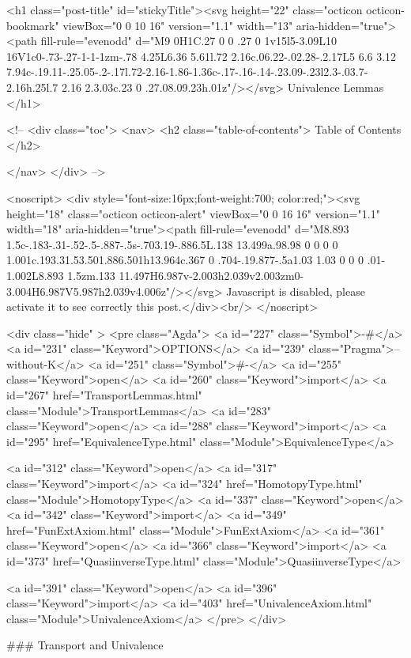   <h1 class="post-title" id="stickyTitle"><svg height="22" class="octicon octicon-bookmark" viewBox="0 0 10 16" version="1.1" width="13" aria-hidden="true"><path fill-rule="evenodd" d="M9 0H1C.27 0 0 .27 0 1v15l5-3.09L10 16V1c0-.73-.27-1-1-1zm-.78 4.25L6.36 5.61l.72 2.16c.06.22-.02.28-.2.17L5 6.6 3.12 7.94c-.19.11-.25.05-.2-.17l.72-2.16-1.86-1.36c-.17-.16-.14-.23.09-.23l2.3-.03.7-2.16h.25l.7 2.16 2.3.03c.23 0 .27.08.09.23h.01z"/></svg> Univalence Lemmas
  </h1>

  <!-- 
  <div class="toc">
    <nav>
    <h2 class="table-of-contents"> Table of Contents </h2>
      

    </nav>
  </div>
   -->

  <noscript>
  <div style="font-size:16px;font-weight:700; color:red;"><svg height="18" class="octicon octicon-alert" viewBox="0 0 16 16" version="1.1" width="18" aria-hidden="true"><path fill-rule="evenodd" d="M8.893 1.5c-.183-.31-.52-.5-.887-.5s-.703.19-.886.5L.138 13.499a.98.98 0 0 0 0 1.001c.193.31.53.501.886.501h13.964c.367 0 .704-.19.877-.5a1.03 1.03 0 0 0 .01-1.002L8.893 1.5zm.133 11.497H6.987v-2.003h2.039v2.003zm0-3.004H6.987V5.987h2.039v4.006z"/></svg> Javascript is disabled, please activate it to see correctly this post.</div><br/>
  </noscript>

  <div class="hide" >
<pre class="Agda">
<a id="227" class="Symbol">{-#</a> <a id="231" class="Keyword">OPTIONS</a> <a id="239" class="Pragma">--without-K</a> <a id="251" class="Symbol">#-}</a>
<a id="255" class="Keyword">open</a> <a id="260" class="Keyword">import</a> <a id="267" href="TransportLemmas.html" class="Module">TransportLemmas</a>
<a id="283" class="Keyword">open</a> <a id="288" class="Keyword">import</a> <a id="295" href="EquivalenceType.html" class="Module">EquivalenceType</a>

<a id="312" class="Keyword">open</a> <a id="317" class="Keyword">import</a> <a id="324" href="HomotopyType.html" class="Module">HomotopyType</a>
<a id="337" class="Keyword">open</a> <a id="342" class="Keyword">import</a> <a id="349" href="FunExtAxiom.html" class="Module">FunExtAxiom</a>
<a id="361" class="Keyword">open</a> <a id="366" class="Keyword">import</a> <a id="373" href="QuasiinverseType.html" class="Module">QuasiinverseType</a>

<a id="391" class="Keyword">open</a> <a id="396" class="Keyword">import</a> <a id="403" href="UnivalenceAxiom.html" class="Module">UnivalenceAxiom</a>
</pre>
</div>

### Transport and Univalence

